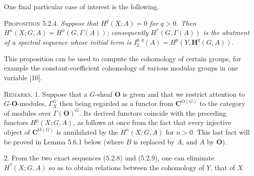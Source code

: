 One final particular case of interest is the following.

\textsc{Proposition 5.2.4.} \textit{Suppose that $H^q(X;A)=0$ for
$q>0$. Then $H^n(X;G,A)=H^n(G,\Gamma(A))$; consequently
$H^*(G,\Gamma(A))$ is the abutment of a spectral sequence whose initial term
is $I_2^{p,q}(A)=H^p(Y,\mathbf H^q(G,A))$.}

This proposition can be used to compute the cohomology of certain groups, for
example the constant-coefficient cohomology of various modular groups in one
variable [10].

\textsc{Remarks. 1.} Suppose that a $G$-sheaf ${\mathbf O}$ is given and that
we restrict attention to $G$-${\mathbf O}$-modules, $\Gamma_X^G$ then being regarded as
a functor from ${\mathbf C}^{\mathrm O(G)}$ to the category of modules over $\Gamma({\mathbf O})^G$.
Its derived functors coincide with the preceding functors $H^p(X;G,A)$, as
follows at once from the fact that every injective object of ${\mathbf C}^{\mathrm O(G)}$ is
annihilated by the $H^n(X;G,A)$ for $n>0$. This last fact will be proved in
Lemma 5.6.1 below (where $B$ is replaced by $A$, and $A$ by ${\mathbf O}$).

2. From the two exact sequences (5.2.8) and (5.2.9), one can
eliminate $H^*(X;G,A)$ so as to obtain relations between the cohomology of
$Y$, that of $X$

